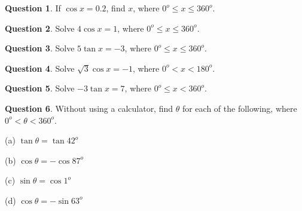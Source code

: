 \documentclass{article}
\theoremstyle{definition}
\newtheorem{question}{Question}
\begin{document}
\begin{question}
	If $\cos x=0.2$, find $x$, where $0^o \leq x \leq 360^o$.
\end{question}
\begin{question}
	Solve $4\cos x = 1$, where $0^o \leq x \leq 360^o$.
\end{question}
\begin{question}
	Solve $5\tan x = -3$, where $0^o \leq x \leq 360^o$.
\end{question}
\begin{question}
	Solve $\sqrt{3} \cos x = -1$, where $0^o < x < 180^o$.
\end{question}
\begin{question}
	Solve $-3\tan x = 7$, where $0^o \leq x < 360^o$.
\end{question}
\begin{question}
Without using a calculator, find $\theta$ for each of the following, where $0^o < \theta < 360^o$.

	(a) $\tan \theta = \tan 42^o$

	(b) $\cos \theta = -\cos 87^o$

	(c) $\sin \theta = \cos 1^o$

	(d) $\cos \theta = -\sin 63^o$

\end{question}
\end{document}
